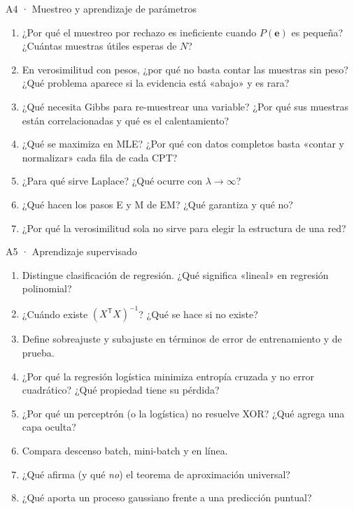 \begin{ejercicio}{A4 · Muestreo y aprendizaje de parámetros }
\begin{enumerate}[label=\arabic*.]
\item ¿Por qué el muestreo por rechazo es ineficiente cuando $P(\mathbf e)$ es pequeña? ¿Cuántas muestras útiles esperas de $N$?
\item En verosimilitud con pesos, ¿por qué no basta contar las muestras sin peso? ¿Qué problema aparece si la evidencia está «abajo» y es rara?
\item ¿Qué necesita Gibbs para re-muestrear una variable? ¿Por qué sus muestras están correlacionadas y qué es el calentamiento?
\item ¿Qué se maximiza en MLE? ¿Por qué con datos completos basta «contar y normalizar» cada fila de cada CPT?
\item ¿Para qué sirve Laplace? ¿Qué ocurre con $\lambda\to\infty$?
\item ¿Qué hacen los pasos E y M de EM? ¿Qué garantiza y qué no?
\item ¿Por qué la verosimilitud sola no sirve para elegir la estructura de una red?
\end{enumerate}
\end{ejercicio}

\begin{ejercicio}{A5 · Aprendizaje supervisado }
\begin{enumerate}[label=\arabic*.]
\item Distingue clasificación de regresión. ¿Qué significa «lineal» en regresión polinomial?
\item ¿Cuándo existe $(X^\mathsf TX)^{-1}$? ¿Qué se hace si no existe?
\item Define sobreajuste y subajuste en términos de error de entrenamiento y de prueba.
\item ¿Por qué la regresión logística minimiza entropía cruzada y no error cuadrático? ¿Qué propiedad tiene su pérdida?
\item ¿Por qué un perceptrón (o la logística) no resuelve XOR? ¿Qué agrega una capa oculta?
\item Compara descenso batch, mini-batch y en línea.
\item ¿Qué afirma (y qué \emph{no}) el teorema de aproximación universal?
\item ¿Qué aporta un proceso gaussiano frente a una predicción puntual?
\end{enumerate}
\end{ejercicio}


